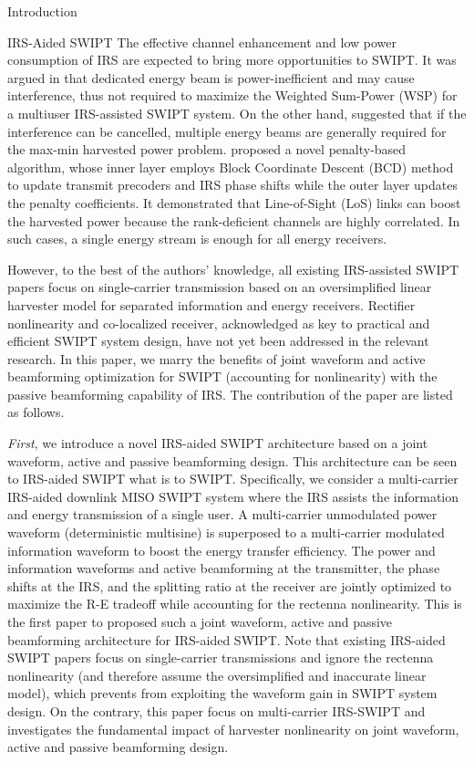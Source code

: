 \documentclass[journal]{IEEEtran}
\begin{document}
\begin{section}{Introduction}
		\begin{subsection}{IRS-Aided SWIPT}
			The effective channel enhancement and low power consumption of IRS are expected to bring more opportunities to SWIPT. It was argued in \cite{Wu2020b} that dedicated energy beam is power-inefficient and may cause interference, thus not required to maximize the Weighted Sum-Power (WSP) for a multiuser IRS-assisted SWIPT system. On the other hand, \cite{Tang2019} suggested that if the interference can be cancelled, multiple energy beams are generally required for the max-min harvested power problem. \cite{Wu2020a} proposed a novel penalty-based algorithm, whose inner layer employs Block Coordinate Descent (BCD) method to update transmit precoders and IRS phase shifts while the outer layer updates the penalty coefficients. It demonstrated that Line-of-Sight (LoS) links can boost the harvested power because the rank-deficient channels are highly correlated. In such cases, a single energy stream is enough for all energy receivers.

			However, to the best of the authors' knowledge, all existing IRS-assisted SWIPT papers focus on single-carrier transmission based on an oversimplified linear harvester model for separated information and energy receivers. Rectifier nonlinearity and co-localized receiver, acknowledged as key to practical and efficient SWIPT system design, have not yet been addressed in the relevant research. In this paper, we marry the benefits of joint waveform and active beamforming optimization for SWIPT (accounting for nonlinearity) with the passive beamforming capability of IRS. The contribution of the paper are listed as follows.

			\textit{First}, we introduce a novel IRS-aided SWIPT architecture based on a joint waveform, active and passive beamforming design. This architecture can be seen to IRS-aided SWIPT what \cite{Clerckx2018b} is to SWIPT. Specifically, we consider a multi-carrier IRS-aided downlink MISO SWIPT system where the IRS assists the information and energy transmission of a single user. A multi-carrier unmodulated power waveform (deterministic multisine) is superposed to a multi-carrier modulated information waveform to boost the energy transfer efficiency. The power and information waveforms and active beamforming at the transmitter, the phase shifts at the IRS, and the splitting ratio at the receiver are jointly optimized to maximize the R-E tradeoff while accounting for the rectenna nonlinearity. This is the first paper to proposed such a joint waveform, active and passive beamforming architecture for IRS-aided SWIPT. Note that existing IRS-aided SWIPT papers \cite{Wu2020b,Tang2019,Wu2020a,Pan2020} focus on single-carrier transmissions and ignore the rectenna nonlinearity (and therefore assume the oversimplified and inaccurate linear model), which prevents from exploiting the waveform gain in SWIPT system design. On the contrary, this paper focus on multi-carrier IRS-SWIPT and investigates the fundamental impact of harvester nonlinearity on joint waveform, active and passive beamforming design.


\end{subsection}
\end{section}
\end{document}
